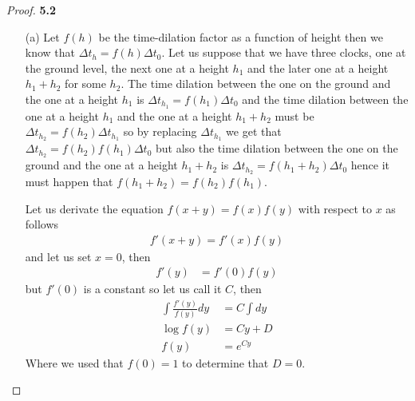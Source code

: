 \documentclass[11pt]{article}
\theoremstyle{definition}
\begin{document}
\cleardoublepage
\begin{proof}{\textbf{5.2}}
\begin{itemize}
    \item [(a)] Let $f(h)$ be the time-dilation factor as a function of height
    then we know that $\Delta t_h = f(h) \Delta t_0$. Let us suppose that we
    have three clocks, one at the ground level, the next one at a height
    $h_1$ and the later one at a height $h_1 + h_2$ for some $h_2$.
    The time dilation between the one on the ground and the one at a height
    $h_1$ is $\Delta t_{h_1} = f(h_1) \Delta t_0$ and the time dilation
    between the one at a height $h_1$ and the one at a height
    $h_1 + h_2$ must be $\Delta t_{h_2} = f(h_2) \Delta t_{h_1}$ so by replacing
    $\Delta t_{h_1}$ we get that $\Delta t_{h_2} = f(h_2)f(h_1) \Delta t_{0}$
    but also the time dilation between the one on the ground and the one
    at a height $h_1 + h_2$ is
    $\Delta t_{h_2} = f(h_1 + h_2) \Delta t_{0}$ hence
    it must happen that $f(h_1 + h_2) = f(h_2)f(h_1)$.

    Let us derivate the equation $f(x + y) = f(x)f(y)$ with respect to $x$
    as follows 
    \begin{align*}
        f'(x + y) = f'(x)f(y)
    \end{align*}
    and let us set $x = 0$, then
    \begin{align*}
        f'(y) &= f'(0)f(y)
    \end{align*}
    but $f'(0)$ is a constant so let us call it $C$, then
    \begin{align*}
        \int \frac{f'(y)}{f(y)}dy &= C \int dy\\
        \log f(y) &= Cy + D\\
        f(y) &= e^{Cy}
    \end{align*}
    Where we used that $f(0) = 1$ to determine that $D = 0$.


\end{itemize}
\end{proof}
\end{document}
